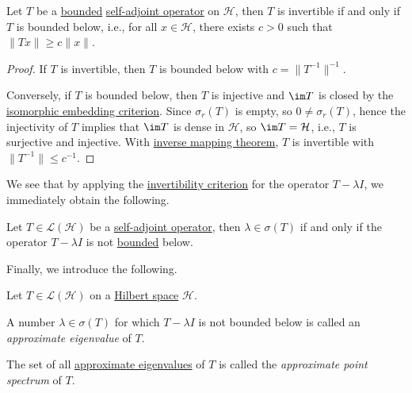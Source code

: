 \begin{lemma}\label{lma:invertibility-criterion}
	Let \(T\) be a \hyperref[rmk:bounded-op]{bounded} \hyperref[def:self-adjoint-op]{self-adjoint operator} on \(\mathcal{H} \), then \(T\) is invertible if and only if \(T\) is bounded below, i.e., for all \(x\in \mathcal{H} \), there exists \(c>0\) such that \(\lVert Tx \rVert \geq c\lVert x \rVert \).
\end{lemma}
\begin{proof}
	If \(T\) is invertible, then \(T\) is bounded below with \(c = \lVert T^{-1}  \rVert ^{-1} \).

	Conversely, if \(T\) is bounded below, then \(T\) is injective and \(\im T\) is closed by the \hyperref[prop:isomorphic-embedding]{isomorphic embedding criterion}. Since \(\sigma _r(T)\) is empty, so \(0 \neq \sigma _r(T)\), hence the injectivity of \(T\) implies that \(\im T\) is dense in \(\mathcal{H} \), so \(\im T=\mathcal{H} \), i.e., \(T\) is surjective and injective. With \hyperref[thm:inverse-mapping]{inverse mapping theorem}, \(T\) is invertible with \(\lVert T^{-1}  \rVert \leq c^{-1} \).
\end{proof}

We see that by applying the \hyperref[lma:invertibility-criterion]{invertibility criterion} for the operator \(T - \lambda I\), we immediately obtain the following.

\begin{corollary}\label{col:criterion-of-spectrum-points}
	Let \(T\in \mathcal{L} (\mathcal{H} )\) be a \hyperref[def:self-adjoint-op]{self-adjoint operator}, then \(\lambda \in \sigma (T)\) if and only if the operator \(T - \lambda I\) is not \hyperref[rmk:bounded-op]{bounded} below.
\end{corollary}

Finally, we introduce the following.

\begin{definition*}
	Let \(T\in \mathcal{L} (\mathcal{H} )\) on a \hyperref[def:Hilbert-space]{Hilbert space} \(\mathcal{H} \).
	\begin{definition}\label{def:approximate-eigenvalue}
		A number \(\lambda \in \sigma (T)\) for which \(T - \lambda I\) is not bounded below is called an \emph{approximate eigenvalue} of \(T\).
	\end{definition}
	\begin{definition}\label{def:approximate-point-spectrum}
		The set of all \hyperref[def:approximate-eigenvalue]{approximate eigenvalues} of \(T\) is called the \emph{approximate point spectrum} of \(T\).
	\end{definition}
\end{definition*}


